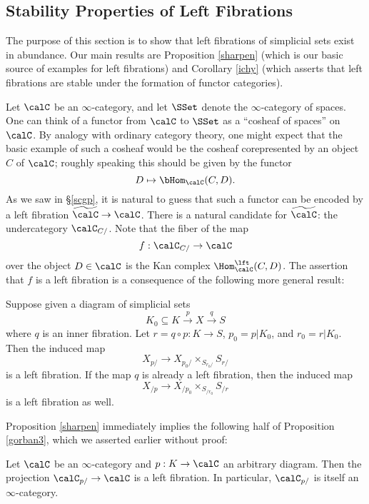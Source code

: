 \subsection{Stability Properties of Left Fibrations}\label{leftfib}

The purpose of this section is to show that left fibrations of simplicial sets exist in abundance. Our main results are Proposition \ref{sharpen} (which is our basic source of examples for left fibrations) and Corollary \ref{ichy} (which asserts that left fibrations are stable under the formation of functor categories). 

Let $\calC$ be an $\infty$-category, and let $\SSet$ denote the $\infty$-category of spaces.
One can think of a functor from $\calC$ to $\SSet$ as a ``cosheaf of spaces'' on $\calC$. By analogy with ordinary category theory, one might expect that the basic example of such a cosheaf would be the cosheaf corepresented by an object $C$ of $\calC$; roughly speaking this should be given by the functor
$$ D \mapsto \bHom_{\calC}(C,D).$$ 
As we saw in \S \ref{scgp}, it is natural to guess that such a functor can be encoded 
by a left fibration $\widetilde{\calC} \rightarrow \calC$. There is a natural candidate
for $\widetilde{\calC}$: the undercategory $\calC_{C/}$. 
Note that the fiber of the map
$$ f: \calC_{C/} \rightarrow \calC$$ over the object $D \in \calC$ is the Kan complex $\Hom_{\calC}^{\lft}(C,D)$. The assertion that $f$ is a left fibration is a consequence of the following more general result:


\begin{proposition}[Joyal]\label{sharpen}
Suppose given a diagram of simplicial sets
$$ K_0 \subseteq K \stackrel{p}{\rightarrow} X \stackrel{q}{\rightarrow} S$$
where $q$ is an inner fibration. Let $r = q \circ p: K \rightarrow S$,
$p_0 = p|K_0$, and $r_0 = r|K_0$. Then the induced map
$$ X_{p/} \rightarrow X_{p_0/} \times_{ S_{r_0/} } S_{r/}$$
is a left fibration. If the map $q$ is already a left fibration, then
the induced map
$$ X_{/p} \rightarrow X_{/ p_0} \times_{ S_{/r_0} } S_{/r}$$
is a left fibration as well.
\end{proposition}

Proposition \ref{sharpen} immediately implies the following half of
Proposition \ref{gorban3}, which we asserted earlier without proof:

\begin{corollary}[Joyal]\label{gorban4}
Let $\calC$ be an $\infty$-category and $p: K \rightarrow \calC$ an arbitrary diagram.
Then the projection $\calC_{p/} \rightarrow \calC$ is a left fibration. In particular, $\calC_{p/}$ is itself an $\infty$-category.
\end{corollary}

